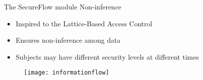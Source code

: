 \begin{frame}{The SecureFlow module \newline Non-inference}
\begin{itemize}
	\item Inspired to the Lattice-Based Access Control
	\item Ensures non-inference among data
	\item Subjects may have different security levels at different times
\end{itemize}
\begin{figure}
	\centering\texttt{[image: informationflow]}
\end{figure}
\end{frame}
